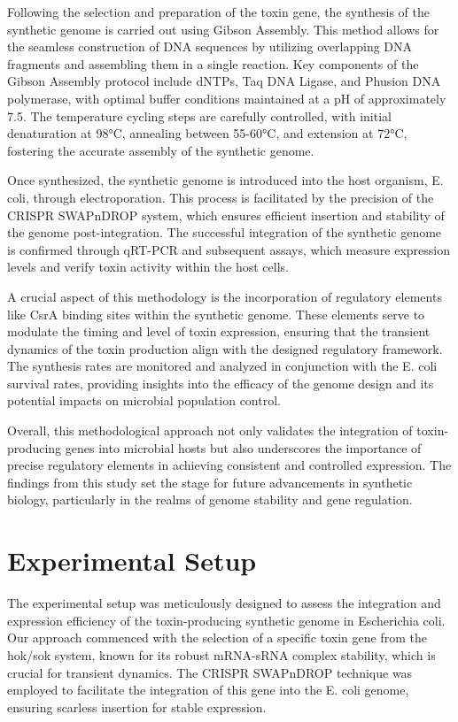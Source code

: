 \documentclass{article}
\begin{document}
Following the selection and preparation of the toxin gene, the synthesis of the synthetic genome is carried out using Gibson Assembly. This method allows for the seamless construction of DNA sequences by utilizing overlapping DNA fragments and assembling them in a single reaction. Key components of the Gibson Assembly protocol include dNTPs, Taq DNA Ligase, and Phusion DNA polymerase, with optimal buffer conditions maintained at a pH of approximately 7.5. The temperature cycling steps are carefully controlled, with initial denaturation at 98°C, annealing between 55-60°C, and extension at 72°C, fostering the accurate assembly of the synthetic genome.

Once synthesized, the synthetic genome is introduced into the host organism, E. coli, through electroporation. This process is facilitated by the precision of the CRISPR SWAPnDROP system, which ensures efficient insertion and stability of the genome post-integration. The successful integration of the synthetic genome is confirmed through qRT-PCR and subsequent assays, which measure expression levels and verify toxin activity within the host cells.

A crucial aspect of this methodology is the incorporation of regulatory elements like CsrA binding sites within the synthetic genome. These elements serve to modulate the timing and level of toxin expression, ensuring that the transient dynamics of the toxin production align with the designed regulatory framework. The synthesis rates are monitored and analyzed in conjunction with the E. coli survival rates, providing insights into the efficacy of the genome design and its potential impacts on microbial population control.

Overall, this methodological approach not only validates the integration of toxin-producing genes into microbial hosts but also underscores the importance of precise regulatory elements in achieving consistent and controlled expression. The findings from this study set the stage for future advancements in synthetic biology, particularly in the realms of genome stability and gene regulation.

\section{Experimental Setup}
The experimental setup was meticulously designed to assess the integration and expression efficiency of the toxin-producing synthetic genome in Escherichia coli. Our approach commenced with the selection of a specific toxin gene from the hok/sok system, known for its robust mRNA-sRNA complex stability, which is crucial for transient dynamics. The CRISPR SWAPnDROP technique was employed to facilitate the integration of this gene into the E. coli genome, ensuring scarless insertion for stable expression.
\end{document}
